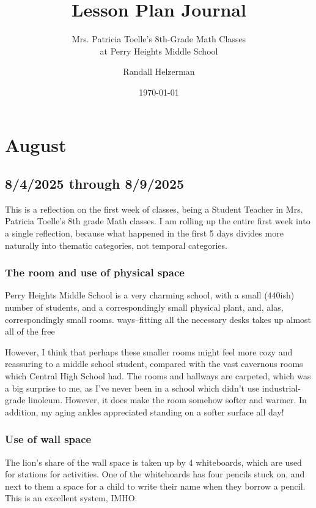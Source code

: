 \documentclass[11pt]{elegantbook}
\title{Lesson Plan Journal}
\subtitle{Mrs. Patricia Toelle's 8th-Grade Math Classes \\ at Perry Heights Middle School}
\author{Randall Helzerman}
\institute{University of Evansville}
\date{\today}
\begin{document}
\maketitle

\frontmatter
\tableofcontents

\mainmatter


\part{August}

\chapter{8/4/2025 through 8/9/2025}

This is a reflection on the first week of classes, being a Student
Teacher in Mrs. Patricia Toelle's 8th grade Math classes.  I am
rolling up the entire first week into a single reflection, because
what happened in the first 5 days divides more naturally into thematic
categories, not temporal categories.

\section*{The room and use of physical space}

Perry Heights Middle School is a very charming school, with a small
(440ish) number of students, and a correspondingly small physical
plant, and, alas, correspondingly small rooms.
ways--fitting all the necessary desks takes up almost all of the free

However, I think that perhaps these smaller rooms might feel more cozy
and reassuring to a middle school student, compared with the vast
cavernous rooms which Central High School had.  The rooms and hallways
are carpeted, which was a big surprise to me, as I've never been in a
school which didn't use industrial-grade linoleum.  However, it does
make the room somehow softer and warmer.  In addition, my aging ankles
appreciated standing on a softer surface all day!

\section*{Use of wall space}

The lion's share of the wall space is taken up by 4 whiteboards, which
are used for stations for activities.  One of the whiteboards has four
pencils stuck on, and next to them a space for a child to write their
name when they borrow a pencil. This is an excellent system, IMHO.
\end{document}
